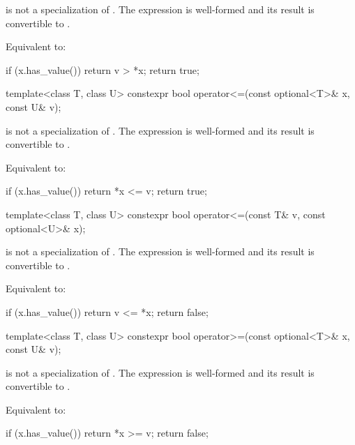 \begin{itemdescr}
\pnum
\constraints
{} is not a specialization of . The expression  is well-formed and its result is convertible to .

\pnum
\effects
Equivalent to:
\begin{codeblock}
if (x.has_value())
  return v > *x;
return true;
\end{codeblock}
\end{itemdescr}

%
\begin{itemdecl}
template<class T, class U>
  constexpr bool operator<=(const optional<T>& x, const U& v);
\end{itemdecl}

\begin{itemdescr}
\pnum
\constraints
{} is not a specialization of . The expression  is well-formed and its result is convertible to .

\pnum
\effects
Equivalent to:
\begin{codeblock}
if (x.has_value())
  return *x <= v;
return true;
\end{codeblock}
\end{itemdescr}

%
\begin{itemdecl}
template<class T, class U>
  constexpr bool operator<=(const T& v, const optional<U>& x);
\end{itemdecl}

\begin{itemdescr}
\pnum
\constraints
{} is not a specialization of . The expression  is well-formed and its result is convertible to .

\pnum
\effects
Equivalent to:
\begin{codeblock}
if (x.has_value())
  return v <= *x;
return false;
\end{codeblock}
\end{itemdescr}

%
\begin{itemdecl}
template<class T, class U>
  constexpr bool operator>=(const optional<T>& x, const U& v);
\end{itemdecl}

\begin{itemdescr}
\pnum
\constraints
{} is not a specialization of . The expression  is well-formed and its result is convertible to .

\pnum
\effects
Equivalent to:
\begin{codeblock}
if (x.has_value())
  return *x >= v;
return false;
\end{codeblock}
\end{itemdescr}

